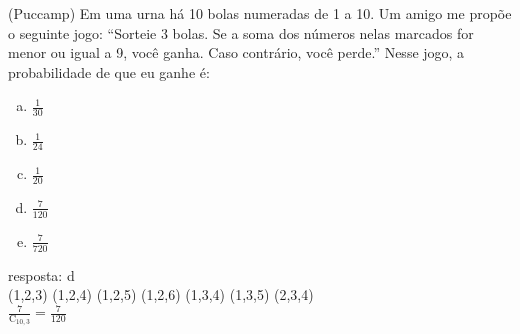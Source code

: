 \begin{ex}
	(Puccamp) Em uma urna há 10 bolas numeradas de 1 a 10. Um amigo me propõe o seguinte jogo: “Sorteie 3 bolas. Se a soma dos números nelas marcados for menor ou igual a 9, você ganha. Caso contrário, você perde.” Nesse jogo, a probabilidade de que eu ganhe é:
    \begin{enumerate}[(a)]
    \item $\frac{1}{30}$
    \item $\frac{1}{24}$
    \item $\frac{1}{20}$
    \item $\frac{7}{120}$
    \item $\frac{7}{720}$
    \end{enumerate}
      \begin{sol}
        resposta: d \\
        (1,2,3) (1,2,4) (1,2,5) (1,2,6) (1,3,4) (1,3,5) (2,3,4) \\
        $\frac{7}{\mathrm{C}_{{10},3}} = \frac{7}{120}$
        
      \end{sol}
\end{ex}